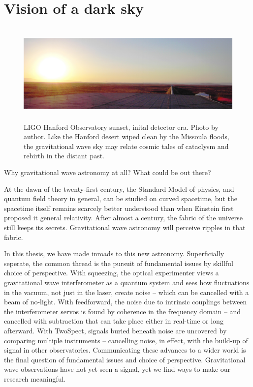     \section{Vision of a dark sky}
    \label{dark_sky}

\begin{figure}
\begin{center}
\includegraphics[height=50mm,width=148mm]{LIGOpanoramasmall.eps}
\caption{LIGO Hanford Observatory sunset, inital detector era. Photo by author. Like the Hanford desert wiped clean by the Missoula floods, the gravitational wave sky may relate cosmic tales of cataclysm and rebirth in the distant past.}
\label{LIGO_panorama_small}
\end{center}
\end{figure}

        Why gravitational wave astronomy at all? What could be out there?

        At the dawn of the twenty-first century, the Standard Model of physics, and quantum field theory in general, can be studied on curved spacetime, but the spacetime itself remains scarcely better understood than when Einstein first proposed it general relativity. 
After almost a century, the fabric of the universe still keeps its secrets. 
Gravitational wave astronomy will perceive ripples in that fabric. 

        In this thesis, we have made inroads to this new astronomy. Superficially seperate, the common thread is the pursuit of fundamental issues by skillful choice of perspective. 
With squeezing, the optical experimenter views a gravitational wave interferometer as a quantum system and sees how fluctuations in the vacuum, not just in the laser, create noise -- which can be cancelled with a beam of no-light.
With feedforward, the noise due to intrinsic couplings between the interferometer servos is found by coherence in the frequency domain -- and cancelled with subtraction that can take place either in real-time or long afterward.
With TwoSpect, signals buried beneath noise are uncovered by comparing multiple instruments -- cancelling noise, in effect, with the build-up of signal in other observatories.
Communicating these advances to a wider world is the final question of fundamental issues and choice of perspective.
Gravitational wave observations have not yet seen a signal, yet we find ways to make our research meaningful.

